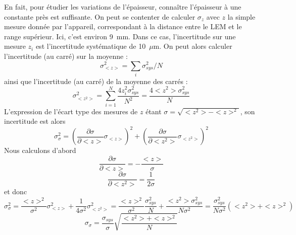 En fait, pour étudier les variations de l'épaisseur, connaître l'épaisseur à une constante près est suffisante. On peut se contenter de calculer $\sigma_z$ avec $z$ la simple mesure donnée par l'appareil, correspondant à la distance entre le LEM et le range supérieur. Ici, c'est environ 9~mm. Dans ce cas, l'incertitude sur une mesure $z_i$ est l'incertitude systématique de 10~$\mu$m. On peut alors calculer l'incertitude (au carré) sur la moyenne : \begin{equation}
    \sigma_{<z>}^2 = \sum_i \sigma_{sys}^2/N
\end{equation}
ainsi que l'incertitude (au carré) de la moyenne des carrés : 
\begin{equation}
    \sigma_{<z^2>}^2 = \sum_{i=1}^N \frac{4z_i^2 \sigma_{sys}^2}{N^2} = \frac{4<z^2> \sigma_{sys}^2}{N}
\end{equation}
L'expression de l'écart type des mesures de $z$ étant $\sigma = \sqrt{<z^2> - <z>^2}$, son incertitude est alors 
\begin{equation}
    \sigma_{\sigma}^2 = \left(\frac{\partial \sigma}{\partial <z>}\sigma_{<z>}\right)^2 + \left(\frac{\partial \sigma}{\partial <z^2>}\sigma_{<z^2>}\right)^2
\end{equation}
Nous calculons d'abord 
\begin{equation}
    \frac{\partial \sigma}{\partial <z>} = -\frac{<z>}{\sigma}
\end{equation}
\begin{equation}
    \frac{\partial \sigma}{\partial <z^2>} = \frac{1}{2\sigma}
\end{equation}
et donc
\begin{equation}
    \sigma_{\sigma}^2 = \frac{<z>^2}{\sigma^2}\sigma_{<z>}^2 + \frac{1}{4\sigma^2}\sigma_{<z^2>}^2 = \frac{<z>^2}{\sigma^2}\frac{\sigma_{sys}^2}{N} + \frac{<z^2>\sigma_{sys}^2}{N\sigma^2}=\frac{\sigma_{sys}^2}{N\sigma^2}(<z^2> + <z>^2)
\end{equation}
\begin{equation}
    \sigma_{\sigma} = \frac{\sigma_{sys}}{\sigma}\sqrt{\frac{<z^2> + <z>^2}{N}}
\end{equation}